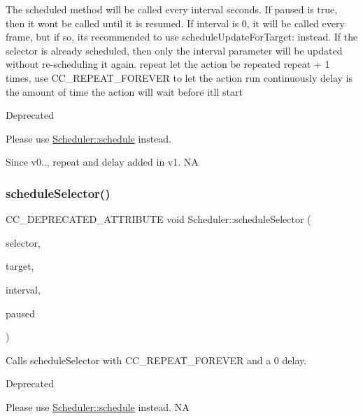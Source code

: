 The scheduled method will be called every \textquotesingle{}interval\textquotesingle{} seconds. If paused is true, then it won\textquotesingle{}t be called until it is resumed. If \textquotesingle{}interval\textquotesingle{} is 0, it will be called every frame, but if so, it\textquotesingle{}s recommended to use \textquotesingle{}schedule\+Update\+For\+Target\+:\textquotesingle{} instead. If the selector is already scheduled, then only the interval parameter will be updated without re-\/scheduling it again. repeat let the action be repeated repeat + 1 times, use C\+C\+\_\+\+R\+E\+P\+E\+A\+T\+\_\+\+F\+O\+R\+E\+V\+ER to let the action run continuously delay is the amount of time the action will wait before it\textquotesingle{}ll start \begin{DoxyRefDesc}{Deprecated}
\item[\hyperlink{deprecated__deprecated000289}{Deprecated}]Please use {\ttfamily \hyperlink{classScheduler_a0d52145629a67e888cf1b25fd01f668b}{Scheduler\+::schedule}} instead. \end{DoxyRefDesc}
\begin{DoxySince}{Since}
v0.., repeat and delay added in v1.  NA 
\end{DoxySince}
\mbox{\label{classScheduler_ab41f346fb140ff11ebc2b0736bc7b58a}} 
\subsubsection{\texorpdfstring{schedule\+Selector()}{scheduleSelector()}\hspace{0.1cm}{\footnotesize\ttfamily [3/4]}}
{\footnotesize\ttfamily C\+C\+\_\+\+D\+E\+P\+R\+E\+C\+A\+T\+E\+D\+\_\+\+A\+T\+T\+R\+I\+B\+U\+TE void Scheduler\+::schedule\+Selector (\begin{DoxyParamCaption}\item[{S\+E\+L\+\_\+\+S\+C\+H\+E\+D\+U\+LE}]{selector,  }\item[{\hyperlink{classRef}{Ref} $\ast$}]{target,  }\item[{float}]{interval,  }\item[{bool}]{paused }\end{DoxyParamCaption})\hspace{0.3cm}{\ttfamily [inline]}}

Calls schedule\+Selector with C\+C\+\_\+\+R\+E\+P\+E\+A\+T\+\_\+\+F\+O\+R\+E\+V\+ER and a 0 delay. \begin{DoxyRefDesc}{Deprecated}
\item[\hyperlink{deprecated__deprecated000055}{Deprecated}]Please use {\ttfamily \hyperlink{classScheduler_a0d52145629a67e888cf1b25fd01f668b}{Scheduler\+::schedule}} instead.  NA \end{DoxyRefDesc}
\mbox{\label{classScheduler_ab41f346fb140ff11ebc2b0736bc7b58a}} 
